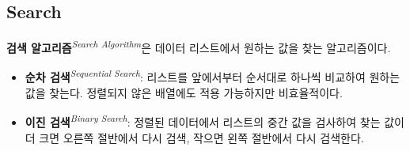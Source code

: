 \subsection{Search}

\textbf{검색 알고리즘}\textit{\textsuperscript{Search Algorithm}}은 데이터 리스트에서 원하는 값을 찾는 알고리즘이다.
\begin{itemize}
\item \textbf{순차 검색}\textit{\textsuperscript{Sequential Search}}: 리스트를 앞에서부터 순서대로 하나씩 비교하여 원하는 값을 찾는다. 정렬되지 않은 배열에도 적용 가능하지만 비효율적이다.
\item \textbf{이진 검색}\textit{\textsuperscript{Binary Search}}: 정렬된 데이터에서 리스트의 중간 값을 검사하여 찾는 값이 더 크면 오른쪽 절반에서 다시 검색, 작으면 왼쪽 절반에서 다시 검색한다.
\end{itemize}
